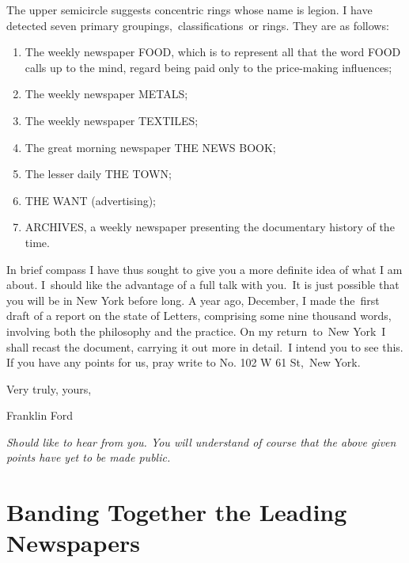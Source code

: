 \documentclass[twoside,symmetric,nobib,justified]{tufte-book}
\let\oldchapter\chapter
\def\chapter{%
  \setcounter{footnote}{0}%
  \oldchapter
}
\begin{document}
The upper semicircle suggests concentric rings whose name is legion. I
have detected seven primary groupings,~classifications~or rings. They
are as follows:~

\begin{enumerate}
\item
  The weekly newspaper FOOD, which is to represent all that the word
  FOOD calls up to the mind, regard being paid only to the price-making
  influences;~
\item
  The weekly newspaper METALS;~
\item
  The weekly newspaper TEXTILES;~
\item
  The great morning newspaper THE NEWS BOOK;~
\item
  The lesser daily THE TOWN;~
\item
  THE WANT (advertising);~
\item
  ARCHIVES, a weekly newspaper presenting the documentary history of the
  time.~~
\end{enumerate}

In brief compass I have thus sought to give you a more definite idea of
what I am about. I~should like the advantage of a full talk with you.~It
is just possible that you will be in New York before long. A year ago,
December, I made the~first draft of a report on the state of Letters,
comprising some nine thousand words, involving both the philosophy and
the practice. On my return~to~New York~I shall recast the document,
carrying it out more in detail.~I intend you to see this. If you have
any points for us, pray write to No. 102 W 61 St,~New York.~

\vspace{.15in}

\hfill Very truly, yours,~

\vspace{0.1in}

\hfill Franklin Ford

\vspace{.15in}

\noindent\emph{Should like to hear from you. You will understand of course that the
above given points have yet to be made public.}


\chapter[Banding Together the Leading Newspapers]{Banding Together the Leading\\\noindent Newspapers}
\label{ch:Banding Together the Leading Newspapers}
\end{document}
